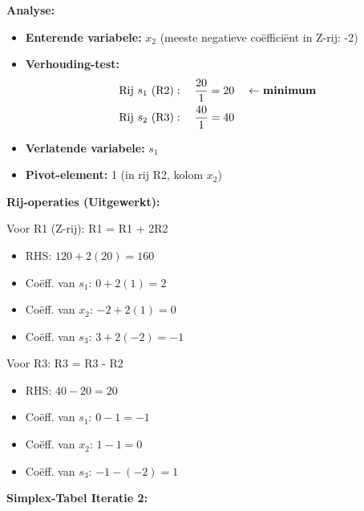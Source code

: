 \documentclass[a4paper,11pt]{article}
\begin{document}
\begin{oefenblok}
    \textbf{Analyse:}
    \begin{itemize}
        \item \textbf{Enterende variabele:} $x_2$ (meeste negatieve coëfficiënt in Z-rij: -2)
        \item \textbf{Verhouding-test:}
              \begin{align*}
                  \text{Rij } s_1 \text{ (R2)}: \quad \frac{20}{1} & = 20 \quad \leftarrow \text{\textbf{minimum}} \\
                  \text{Rij } s_2 \text{ (R3)}: \quad \frac{40}{1} & = 40
              \end{align*}
        \item \textbf{Verlatende variabele:} $s_1$
        \item \textbf{Pivot-element:} 1 (in rij R2, kolom $x_2$)
    \end{itemize}

    \textbf{Rij-operaties (Uitgewerkt):}

    Voor R1 (Z-rij): R1 = R1 + 2R2
    \begin{itemize}
        \item RHS: $120 + 2(20) = 160$
        \item Coëff. van $s_1$: $0 + 2(1) = 2$
        \item Coëff. van $x_2$: $-2 + 2(1) = 0$
        \item Coëff. van $s_3$: $3 + 2(-2) = -1$
    \end{itemize}

    Voor R3: R3 = R3 - R2
    \begin{itemize}
        \item RHS: $40 - 20 = 20$
        \item Coëff. van $s_1$: $0 - 1 = -1$
        \item Coëff. van $x_2$: $1 - 1 = 0$
        \item Coëff. van $s_3$: $-1 - (-2) = 1$
    \end{itemize}

    \textbf{Simplex-Tabel Iteratie 2:}

    \vspace{0.3cm}


\end{oefenblok}
\end{document}
